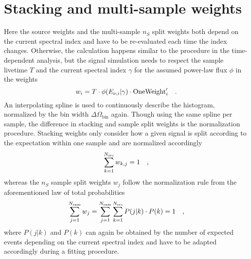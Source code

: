 \section{Stacking and multi-sample weights}
Here the source weights and the multi-sample $n_S$ split weights both depend on the current spectral index and have to be re-evaluated each time the index changes.
Otherwise, the calculation happens similar to the procedure in the time-dependent analysis, but the signal simulation needs to respect the sample livetime $T$ and the current spectral index $\gamma$ for the assumed power-law flux $\phi$ in the weights
\begin{equation}
  w_i = T\cdot \phi(E_{\nu,i}|\gamma)\cdot\text{OneWeight}'_i
  \quad\text{.}
\end{equation}
An interpolating spline is used to continuously describe the histogram, normalized by the bin width $\Delta\Omega_\text{bin}$ again.
Though using the same spline per sample, the difference in stacking and sample split weights is the normalization procedure.
Stacking weights only consider how a given signal is split according to the expectation within one sample and are normalized accordingly
\begin{equation}
  \sum_{k=1}^{N_\text{src}} w_{k,j} = 1
  \quad\text{,}
\end{equation}
whereas the $n_S$ sample split weights $w_j$ follow the normalization rule from the aforementioned law of total probabilities
\begin{equation}
  \sum_{j=1}^{N_\text{sam}} w_j
  = \sum_{j=1}^{N_\text{sam}} \sum_{k=1}^{N_\text{src}} P(j|k)\cdot P(k) = 1
  \quad\text{,}
\end{equation}
where $P(j|k)$ and $P(k)$ can again be obtained by the number of expected events depending on the current spectral index and have to be adapted accordingly during a fitting procedure.



